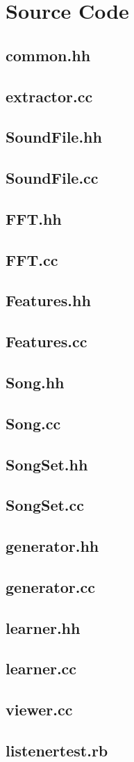 \pagebreak
\marginsize{1cm}{1cm}{1cm}{1cm}
\chapter{Source Code}

\newcommand{\inputcode}[1]{
\section{#1}
\label{code:#1}
\small

}

\inputcode{common.hh}
\inputcode{extractor.cc}
\inputcode{SoundFile.hh}
\inputcode{SoundFile.cc}
\inputcode{FFT.hh}
\inputcode{FFT.cc}
\inputcode{Features.hh}
\inputcode{Features.cc}
\inputcode{Song.hh}
\inputcode{Song.cc}
\inputcode{SongSet.hh}
\inputcode{SongSet.cc}
\inputcode{generator.hh}
\inputcode{generator.cc}
\inputcode{learner.hh}
\inputcode{learner.cc}
\inputcode{viewer.cc}
\inputcode{listenertest.rb}
